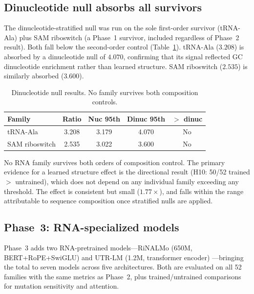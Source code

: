 \documentclass[11pt]{article}
\begin{document}
\subsection{Dinucleotide null absorbs all survivors}
\label{sec:dinuc_results}

The dinucleotide-stratified null was run on the sole first-order
survivor (tRNA-Ala) plus SAM riboswitch (a Phase~1 survivor, included
regardless of Phase~2 result).  Both fall below the second-order
control (Table~\ref{tab:dinuc}).  tRNA-Ala ($3.208$) is absorbed by a
dinucleotide null of $4.070$, confirming that its signal reflected GC
dinucleotide enrichment rather than learned structure.  SAM riboswitch
($2.535$) is similarly absorbed ($3.600$).

\begin{table}[t]
\centering
\caption{Dinucleotide null results.  No family survives both
  composition controls.}
\label{tab:dinuc}
\begin{tabular}{@{}lcccc@{}}
\toprule
\textbf{Family} & \textbf{Ratio} &
  \textbf{Nuc 95th} & \textbf{Dinuc 95th} & \textbf{$>$ dinuc} \\
\midrule
tRNA-Ala          & 3.208 & 3.179 & 4.070 & No \\
SAM riboswitch    & 2.535 & 3.022 & 3.600 & No \\
\bottomrule
\end{tabular}
\end{table}

No RNA family survives both orders of composition control.  The
primary evidence for a learned structure effect is the directional
result (H10: 50/52 trained $>$ untrained), which does not depend on
any individual family exceeding any threshold.  The effect is
consistent but small ($1.77\times$), and falls within the range
attributable to sequence composition once stratified nulls are applied.

\subsection{Phase~3: RNA-specialized models}
\label{sec:phase3}

Phase~3 adds two RNA-pretrained models---RiNALMo (650M,
BERT+RoPE+SwiGLU) \citep{penic2024rinalmo} and UTR-LM (1.2M,
transformer encoder) \citep{chu2024utrlm}---bringing the total to
seven models across five architectures.  Both are evaluated on all 52
families with the same metrics as Phase~2, plus trained/untrained
comparisons for mutation sensitivity and attention.
\end{document}
